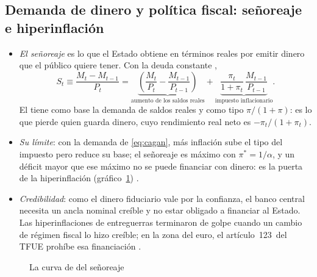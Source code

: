 \documentclass[11pt]{article}
\begin{document}
\subsection{Demanda de dinero y política fiscal:\cortetitulo{} señoreaje e hiperinflación}\label{sec:senoreaje-hiperinflacion}

\begin{itemize}
\item \emph{El señoreaje} es lo que el Estado obtiene en términos reales por emitir dinero que el público quiere tener. Con la deuda constante ,
  \begin{equation}\label{eq:senoreaje}
  S_t\equiv\frac{M_t-M_{t-1}}{P_t}=\underbrace{\left(\frac{M_t}{P_t}-\frac{M_{t-1}}{P_{t-1}}\right)}_{\text{aumento de los saldos reales}}+\underbrace{\frac{\pi_t}{1+\pi_t}\,\frac{M_{t-1}}{P_{t-1}}}_{\text{impuesto inflacionario}}.
  \end{equation}
  El  tiene como base la demanda de saldos reales y como tipo $\pi/(1+\pi)$: es lo que pierde quien guarda dinero, cuyo rendimiento real neto es $-\pi_t/(1+\pi_t)$.
\item \emph{Su límite}: con la demanda de  \eqref{eq:cagan}, más inflación sube el tipo del impuesto pero reduce su base; el señoreaje es máximo con $\pi^*=1/\alpha$, y un déficit mayor que ese máximo no se puede financiar con dinero: es la puerta de la hiperinflación (gráfico~\ref{fig:laffer-senoreaje}) .
\item \emph{Credibilidad}: como el dinero fiduciario vale por la confianza, el banco central necesita un ancla nominal creíble y no estar obligado a financiar al Estado. Las hiperinflaciones de entreguerras terminaron de golpe cuando un cambio de régimen fiscal lo hizo creíble\nocite{Sargent1982Ends}; en la zona del euro, el artículo~123~del TFUE prohíbe esa financiación .
\end{itemize}

\begin{figure}[H]
\centering
\caption{La curva de  del señoreaje}\label{fig:laffer-senoreaje}
\end{figure}
\end{document}
